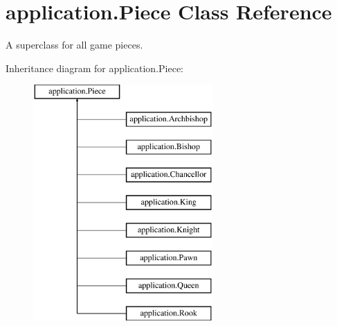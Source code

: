 \hypertarget{classapplication_1_1_piece}{\section{application.\+Piece Class Reference}
\label{classapplication_1_1_piece}
}


A superclass for all game pieces.  


Inheritance diagram for application.\+Piece\+:\begin{figure}[H]
\begin{center}
\leavevmode
\includegraphics[height=9.000000cm]{classapplication_1_1_piece}
\end{center}
\end{figure}
